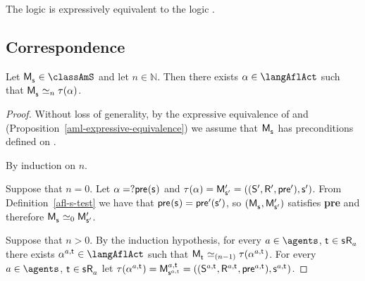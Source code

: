\begin{corollary}
The logic \logicAflS{} is expressively equivalent to the logic \logicS{}.
\end{corollary}

\subsection{Correspondence}

\begin{theorem}\label{afl-s-correspondence}
Let $\aPModel{\aStateS} \in \classAmS$ and let $n \in \mathbb{N}$. 
Then there exists $\alpha \in \langAflAct$ such that $\aPModel{\aStateS} \bisimilar[n] \tau(\alpha)$.
\end{theorem}

\begin{proof}
Without loss of generality, by the expressive equivalence of \logicAmlS{} and \logicS{} (Proposition~\ref{aml-expressive-equivalence}) we assume that $\aPModel{\aStateS}$ has preconditions defined on \langMl{}.

By induction on $n$.

Suppose that $n = 0$. 
Let $\alpha = \test{\aPrecondition(\aStateS)}$ and $\tau(\alpha) = \aPModelP{\aStateSP} = \aPModelTupleP{\aStateSP}$. 
From Definition~\ref{afl-s-test} we have that $\aPrecondition(\aStateS) = \aPreconditionP(\aStateSP)$, so $(\aPModel{\aStateS}, \aPModelP{\aStateSP})$ satisfies {\bf pre} and therefore $\aPModel{\aStateS} \bisimilar[0] \aPModelP{\aStateSP}$.

Suppose that $n > 0$. 
By the induction hypothesis, for every $\agentA \in \agents$, $\aStateT \in \aStateS \aAccessibility{\agentA}$ there exists $\alpha^{\agentA,\aStateT} \in \langAflAct$ such that 
$\aPModel{\aStateT} \bisimilar[(n - 1)] \tau(\alpha^{\agentA,\aStateT})$. 
For every $\agentA \in \agents$, $\aStateT \in \aStateS \aAccessibility{\agentA}$ let $\tau(\alpha^{\agentA,\aStateT}) = \aPModel[\agentA,\aStateT]{\aStateS[\agentA,\aStateT]} = \aPModelTuple[\agentA,\aStateT]{\aStateS[\agentA,\aStateT]}$.


\end{proof}
